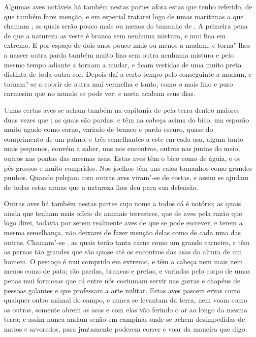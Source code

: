 Algumas aves notáveis há também nestas partes afora estas que tenho
referido, de que também farei menção, e em especial tratarei logo de
umas marítimas a que chamam ; as quais serão pouco mais ou menos
do tamanho de . A primeira pena de que a natureza as veste é
branca sem nenhuma mistura, e mui fina em extremo. E por espaço de dois
anos pouco mais ou menos a mudam, e torna"-lhes a nascer outra parda também 
muito fina sem outra nenhuma mistura e pelo mesmo tempo adiante a tornam a mudar, e ficam vestidas de
uma muito preta distinta de toda outra cor. Depois daí a certo tempo
pelo conseguinte a mudam, e tornam"-se a cobrir de outra mui vermelha e
tanto, como o mais fino e puro carmesim que no mundo se pode ver; e
nesta acabam seus dias.

Umas certas aves se acham também na capitania de  pela terra
dentro maiores duas vezes que ; as quais são pardas, e têm
na cabeça acima do bico, um esporão muito agudo como corno, variado de
branco e pardo escuro, quase do comprimento de um palmo, e três
semelhantes a este em cada asa, algum tanto mais pequenos, convém a
saber, uns nos encontros, outros nas juntas do meio, outros nas pontas
das mesmas asas. Estas aves têm o bico como de águia, e os pés grossos			%
e muito compridos. Nos joelhos têm uns calos tamanhos como grandes
punhos. Quando pelejam com outras aves viram"-se de costas, e assim se 
ajudam de todas estas armas que a natureza lhes deu para sua defensão.

Outras aves há também nestas partes cujo nome a todos cá é notório; as
quais ainda que tenham mais ofício de animais terrestres, que de aves
pela razão que logo direi, todavia por serem realmente aves de que se
pode escrever, e terem a mesma semelhança, não deixarei de fazer menção
delas como de cada uma das outras. Chamam"-se , as quais terão tanta
carne como um grande carneiro, e têm as pernas tão grandes que são
quase até os encontros das asas da altura de um homem. O pescoço é mui
comprido em extremo, e têm a cabeça nem mais nem menos como de pata;			%
são pardas, brancas e pretas, e variadas pelo corpo de umas penas mui
formosas que cá entre nós costumam servir nas gorras e chapéus de
pessoas galantes e que professam a arte militar. Estas aves pascem
ervas como qualquer outro animal do campo, e nunca se levantam da
terra, nem voam como as outras, somente abrem as asas e com elas vão
ferindo o ar ao longo da mesma terra; e assim nunca andam senão em
campinas onde se achem desimpedidas de matos e arvoredos, para \EP 
juntamente poderem correr e voar da maneira que digo.

